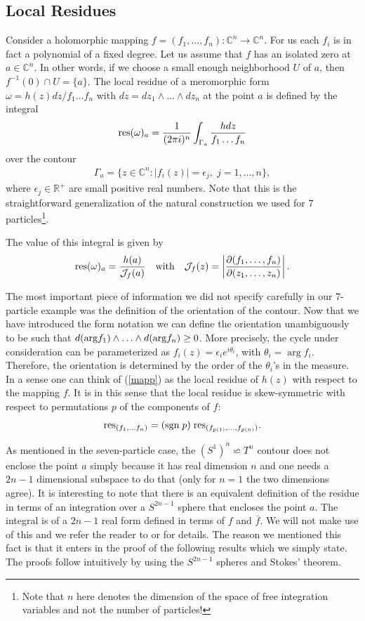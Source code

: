 \documentclass[12pt]{article}
\newcommand{\del}{\partial}
\newcommand{\be}{\begin{eqnarray}}
\newcommand{\ee}{\end{eqnarray}}
\begin{document}
\subsection{Local Residues}

Consider a holomorphic mapping $f=(f_1,\ldots, f_n): \mathbb{C}^n\to \mathbb{C}^n$. For us each $f_i$ is in fact a polynomial of a fixed degree. Let us assume that $f$ has an isolated zero at $a\in \mathbb{C}^n$. In other words, if we choose a small enough neighborhood $U$ of $a$, then $f^{-1}(0)\cap U = \{a\}$. The local residue of a meromorphic form $\omega = h(z) dz/f_1\ldots f_n$ with $dz=dz_1\wedge\ldots \wedge dz_n$ at the point $a$ is defined by the integral
%
\be
\label{mapp}
{\rm res}(\omega)_a = \frac{1}{(2\pi i)^n} \int_{\Gamma_a} \frac{h dz}{f_1\ldots f_n}
\ee
%
over the contour
%
\be
\Gamma_a  = \{ z\in \mathbb{C}^n: |f_i(z)|=\epsilon_j, \; j = 1,\ldots ,n \},
\ee
where $\epsilon_j\in \mathbb{R}^+$ are small positive real numbers. Note that this is the straightforward generalization of the natural construction we used for $7$ particles\footnote{Note that $n$ here denotes the dimension of the space of free integration variables and not the number of particles!}.

The value of this integral is given by
%
\be
{\rm res}(\omega)_a = \frac{h(a)}{{\cal J}_f(a)}\quad {\rm with} \quad {\cal J}_f(z)=\left|\frac{\del (f_1,\ldots,f_n)}{\del (z_1,\ldots ,z_n)} \right|.
\ee
%

The most important piece of information we did not specify carefully in our 7-particle example was the definition of the orientation of the contour. Now that we have introduced the form notation we can define the orientation unambiguously to be such that $d({\rm arg} f_1)\wedge \ldots \wedge d({\rm arg}f_n) \geq 0$. More precisely, the cycle under consideration can be parameterized as $f_i(z) =\epsilon_i e^{i\theta_i}$, with $\theta_i = {\arg}f_i$. Therefore, the orientation is determined by the order of the $\theta_i$'s in the measure. In a sense one can think of (\ref{mapp}) as the local residue of $h(z)$ with respect to the mapping $f$. It is in this sense that the local residue is skew-symmetric with respect to permutations $p$ of the components of $f$:
%
\be
{\rm res}_{(f_1,\ldots f_n)} = ({\rm sgn}\;p)\; {\rm res}_{(f_{p(1)},\ldots, f_{p(n)})}.
\ee
%

As mentioned in the seven-particle case, the $(S^1)^n\backsimeq T^n$ contour does not enclose the point $a$ simply because it has real dimension $n$ and one needs a $2n-1$ dimensional subspace to do that (only for $n=1$ the two dimensions agree). It is interesting to note that there is an equivalent definition of the residue in terms of an integration over a $S^{2n-1}$ sphere that encloses the point $a$. The integral is of a $2n-1$ real form defined in terms of $f$ and $\bar f$. We will not make use of this and we refer the reader to \cite{GH} or \cite{Tsikh} for details. The reason we mentioned this fact is that it enters in the proof of the following results which we simply state. The proofs follow intuitively by using the $S^{2n-1}$ spheres and Stokes' theorem.
\end{document}
